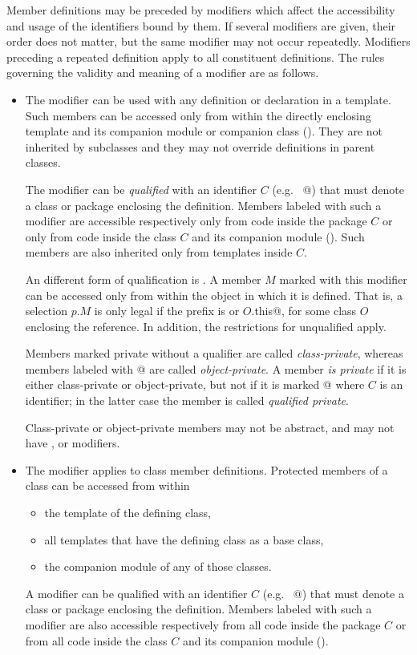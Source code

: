 Member definitions may be preceded by modifiers which affect the
accessibility and usage of the identifiers bound by them.  If several
modifiers are given, their order does not matter, but the same
modifier may not occur repeatedly.  Modifiers preceding a repeated
definition apply to all constituent definitions.  The rules governing
the validity and meaning of a modifier are as follows.
\begin{itemize}
\item
The  modifier can be used with any definition or
declaration in a template.  Such members can be accessed only from
within the directly enclosing template and its companion module or companion class
().  They
are not inherited by subclasses and they may not override definitions
in parent classes.

The modifier can be {\em qualified} with an identifier $C$ (e.g.
~\lstinline@private[$C$]@) that must denote a class or package
enclosing the definition.  Members labeled with such a modifier are
accessible respectively only from code inside the package $C$ or only
from code inside the class $C$ and its companion module
(). Such members are also inherited only from
templates inside $C$.

An different form of qualification is . A member
$M$ marked with this modifier can be accessed only from within
the object in which it is defined. That is, a selection $p.M$ is only
legal if the prefix is  or \lstinline@$O$.this@, for some
class $O$ enclosing the reference. In addition, the restrictions for
unqualified  apply.

Members marked private without a qualifier are called {\em
class-private}, whereas members labeled with \lstinline@private[this]@
are called {\em object-private}.  A member {\em is private} if it is
either class-private or object-private, but not if it is marked
\lstinline@private[$C$]@ where $C$ is an identifier; in the latter
case the member is called {\em qualified private}.

Class-private or object-private members may not be abstract, and may
not have ,  or  modifiers.
\item
The  modifier applies to class member definitions.
Protected members of a class can be accessed from within
\begin{itemize}
\item the template of the defining class, 
\item all templates that have the defining class as a base class,
\item the companion module of any of those classes.
\end{itemize}
A  modifier can be qualified with an
identifier $C$ (e.g.  ~\lstinline@protected[$C$]@) that must denote a
class or package enclosing the definition.  Members labeled with such
a modifier are also accessible respectively from all code inside the
package $C$ or from all code inside the class $C$ and its companion
module ().


\end{itemize}
